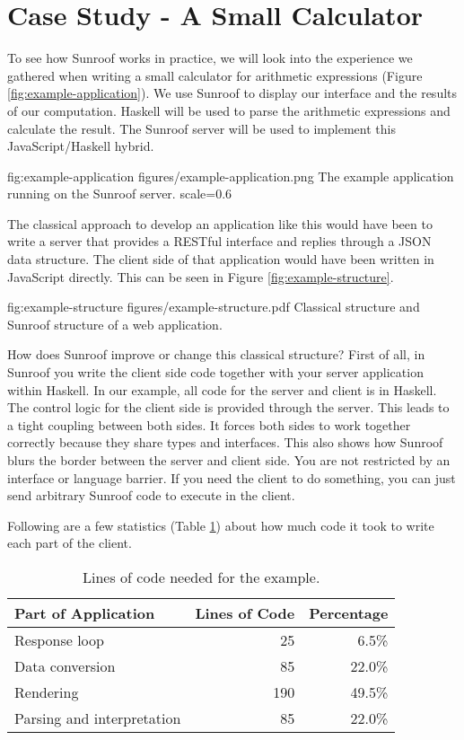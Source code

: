  
\section{Case Study - A Small Calculator}
\label{sec:extended-example}

To see how Sunroof works in practice, we will look into the 
experience we gathered when writing a small calculator
for arithmetic expressions (Figure \ref{fig:example-application}). 
We use Sunroof to display our interface
and the results of our computation. Haskell will be used to parse the 
arithmetic expressions and calculate the result. The Sunroof server 
will be used to implement this JavaScript/Haskell hybrid.

\FigureS%
{fig:example-application}%
{figures/example-application.png}%
{The example application running on the Sunroof server.}%
{scale=0.6}

The classical approach to develop an application like this would have 
been to write a server that provides a RESTful interface and replies 
through a JSON data structure. 
The client side of that application would have been written in JavaScript
directly.
This can be seen in Figure \ref{fig:example-structure}.

\Figure%
{fig:example-structure}%
{figures/example-structure.pdf}%
{Classical structure and Sunroof structure of a web application.}

How does Sunroof improve or change this classical structure?
First of all, in Sunroof you write the client side code together with
your server application within Haskell. In our example, all code 
for the server and client is in Haskell. The control logic 
for the client side is provided through the server.
This leads to a tight coupling between both sides. 
It forces both sides to work together
correctly because they share types and interfaces. 
This also shows how Sunroof blurs the border between the server 
and client side. You are not restricted by an interface or language 
barrier. If you need the client to do something, you can just 
send arbitrary Sunroof code to execute in the client.

Following are a few statistics (Table \ref{tab:example-statistics}) 
about how much code it took to write each part of the client.

\begin{table}
\begin{center}
\begin{tabular}{l@{\quad}r@{\quad}r}
\hline\rule{0pt}{12pt}%
Part of Application & Lines of Code & Percentage \\[2pt]
\hline\rule{0pt}{12pt}%
Response loop & 25 & 6.5\% \\[2pt]
Data conversion & 85 & 22.0\% \\[2pt]
Rendering & 190 & 49.5\% \\[2pt]
Parsing and interpretation & 85 & 22.0\% \\[2pt]
\hline
\end{tabular}
\end{center}
\caption{Lines of code needed for the example.}
\label{tab:example-statistics}
\end{table} 

